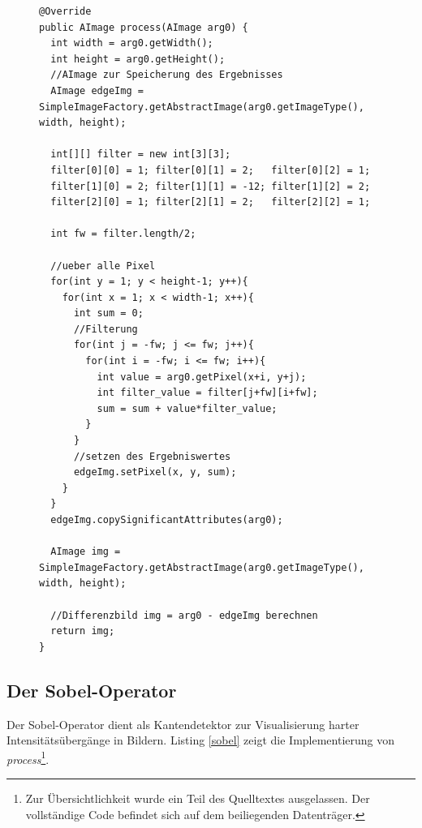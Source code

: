 \begin{figure}[htbp]
\begin{lstlisting}[frame=leftline]
@Override
public AImage process(AImage arg0) {
  int width = arg0.getWidth();
  int height = arg0.getHeight();
  //AImage zur Speicherung des Ergebnisses	
  AImage edgeImg = SimpleImageFactory.getAbstractImage(arg0.getImageType(), width, height);

  int[][] filter = new int[3][3];
  filter[0][0] = 1; filter[0][1] = 2;   filter[0][2] = 1; 
  filter[1][0] = 2; filter[1][1] = -12; filter[1][2] = 2;
  filter[2][0] = 1; filter[2][1] = 2;   filter[2][2] = 1;

  int fw = filter.length/2;
  
  //ueber alle Pixel		
  for(int y = 1; y < height-1; y++){
    for(int x = 1; x < width-1; x++){
      int sum = 0;
      //Filterung
      for(int j = -fw; j <= fw; j++){
        for(int i = -fw; i <= fw; i++){
          int value = arg0.getPixel(x+i, y+j);
          int filter_value = filter[j+fw][i+fw];
          sum = sum + value*filter_value;
        }
      }
      //setzen des Ergebniswertes
      edgeImg.setPixel(x, y, sum);
    }
  }
  edgeImg.copySignificantAttributes(arg0);
		
  AImage img = SimpleImageFactory.getAbstractImage(arg0.getImageType(), width, height);
		
  //Differenzbild img = arg0 - edgeImg berechnen
  return img;
}
\end{lstlisting}
\end{figure}
 
\FloatBarrier
\subsection{Der Sobel-Operator}

Der Sobel-Operator dient als Kantendetektor zur Visualisierung harter Intensitätsübergänge in Bildern. Listing \ref{sobel} zeigt die Implementierung von \textit{process}\footnote{Zur Übersichtlichkeit wurde ein Teil des Quelltextes ausgelassen. Der vollständige Code befindet sich auf dem beiliegenden Datenträger.}.

